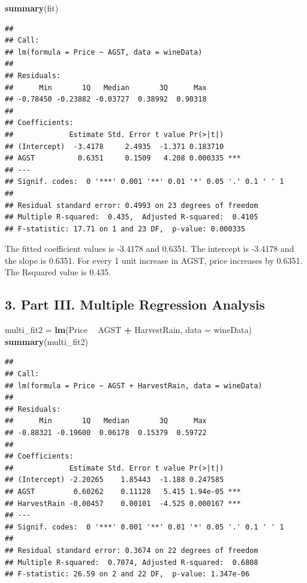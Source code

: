 \documentclass[
]{article}
\newenvironment{Shaded}{\begin{snugshade}}{\end{snugshade}}
\newcommand{\DataTypeTok}[1]{\textcolor[rgb]{0.13,0.29,0.53}{#1}}
\newcommand{\KeywordTok}[1]{\textcolor[rgb]{0.13,0.29,0.53}{\textbf{#1}}}
\newcommand{\NormalTok}[1]{#1}
\newcommand{\OperatorTok}[1]{\textcolor[rgb]{0.81,0.36,0.00}{\textbf{#1}}}
\newcommand{\StringTok}[1]{\textcolor[rgb]{0.31,0.60,0.02}{#1}}
\begin{document}
\begin{Shaded}
\begin{Highlighting}[]
\KeywordTok{summary}\NormalTok{(fit)}
\end{Highlighting}
\end{Shaded}

\begin{verbatim}
## 
## Call:
## lm(formula = Price ~ AGST, data = wineData)
## 
## Residuals:
##      Min       1Q   Median       3Q      Max 
## -0.78450 -0.23882 -0.03727  0.38992  0.90318 
## 
## Coefficients:
##             Estimate Std. Error t value Pr(>|t|)    
## (Intercept)  -3.4178     2.4935  -1.371 0.183710    
## AGST          0.6351     0.1509   4.208 0.000335 ***
## ---
## Signif. codes:  0 '***' 0.001 '**' 0.01 '*' 0.05 '.' 0.1 ' ' 1
## 
## Residual standard error: 0.4993 on 23 degrees of freedom
## Multiple R-squared:  0.435,  Adjusted R-squared:  0.4105 
## F-statistic: 17.71 on 1 and 23 DF,  p-value: 0.000335
\end{verbatim}

The fitted coefficient values is -3.4178 and 0.6351. The intercept is
-3.4178 and the slope is 0.6351. For every 1 unit increase in AGST,
price increases by 0.6351. The Rsquared value is 0.435.

\hypertarget{part-iii.-multiple-regression-analysis}{%
\subsection{3. Part III. Multiple Regression
Analysis}\label{part-iii.-multiple-regression-analysis}}

\begin{Shaded}
\begin{Highlighting}[]
\NormalTok{multi_fit2 =}\StringTok{ }\KeywordTok{lm}\NormalTok{(Price }\OperatorTok{~}\StringTok{ }\NormalTok{AGST }\OperatorTok{+}\StringTok{ }\NormalTok{HarvestRain, }\DataTypeTok{data =}\NormalTok{ wineData)}
\KeywordTok{summary}\NormalTok{(multi_fit2)}
\end{Highlighting}
\end{Shaded}

\begin{verbatim}
## 
## Call:
## lm(formula = Price ~ AGST + HarvestRain, data = wineData)
## 
## Residuals:
##      Min       1Q   Median       3Q      Max 
## -0.88321 -0.19600  0.06178  0.15379  0.59722 
## 
## Coefficients:
##             Estimate Std. Error t value Pr(>|t|)    
## (Intercept) -2.20265    1.85443  -1.188 0.247585    
## AGST         0.60262    0.11128   5.415 1.94e-05 ***
## HarvestRain -0.00457    0.00101  -4.525 0.000167 ***
## ---
## Signif. codes:  0 '***' 0.001 '**' 0.01 '*' 0.05 '.' 0.1 ' ' 1
## 
## Residual standard error: 0.3674 on 22 degrees of freedom
## Multiple R-squared:  0.7074, Adjusted R-squared:  0.6808 
## F-statistic: 26.59 on 2 and 22 DF,  p-value: 1.347e-06
\end{verbatim}
\end{document}

